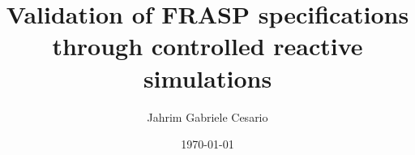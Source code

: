 \school{\unibo}
\title{Validation of FRASP specifications through controlled reactive simulations}
\author{Jahrim Gabriele Cesario}
\date{\today}
\subject{Pervasive Computing}
